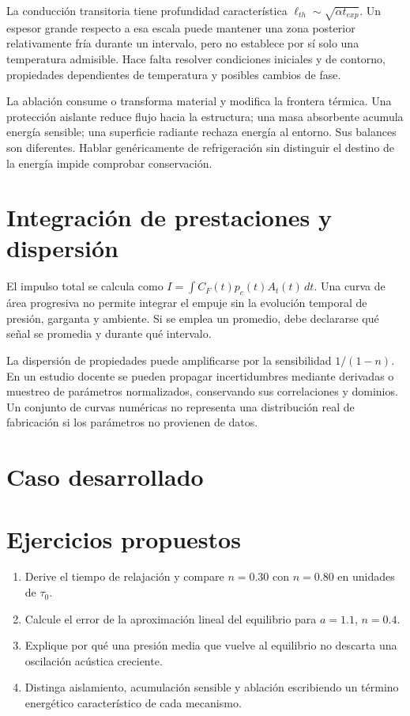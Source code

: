 La conducción transitoria tiene profundidad característica $\ell_{th}\sim\sqrt{\alpha t_{exp}}$. Un espesor grande respecto a esa escala puede mantener una zona posterior relativamente fría durante un intervalo, pero no establece por sí solo una temperatura admisible. Hace falta resolver condiciones iniciales y de contorno, propiedades dependientes de temperatura y posibles cambios de fase.

La ablación consume o transforma material y modifica la frontera térmica. Una protección aislante reduce flujo hacia la estructura; una masa absorbente acumula energía sensible; una superficie radiante rechaza energía al entorno. Sus balances son diferentes. Hablar genéricamente de refrigeración sin distinguir el destino de la energía impide comprobar conservación.\cite{MIT10}
\section{Integración de prestaciones y dispersión}
El impulso total se calcula como $I=\int C_F(t)p_c(t)A_t(t)\,dt$. Una curva de área progresiva no permite integrar el empuje sin la evolución temporal de presión, garganta y ambiente. Si se emplea un promedio, debe declararse qué señal se promedia y durante qué intervalo.

La dispersión de propiedades puede amplificarse por la sensibilidad $1/(1-n)$. En un estudio docente se pueden propagar incertidumbres mediante derivadas o muestreo de parámetros normalizados, conservando sus correlaciones y dominios. Un conjunto de curvas numéricas no representa una distribución real de fabricación si los parámetros no provienen de datos.
\section{Caso desarrollado}

\section{Ejercicios propuestos}
\begin{enumerate}
\item Derive el tiempo de relajación y compare $n=0.30$ con $n=0.80$ en unidades de $\tau_0$.
\item Calcule el error de la aproximación lineal del equilibrio para $a=1.1$, $n=0.4$.
\item Explique por qué una presión media que vuelve al equilibrio no descarta una oscilación acústica creciente.
\item Distinga aislamiento, acumulación sensible y ablación escribiendo un término energético característico de cada mecanismo.
\end{enumerate}


\studiumchaptercheck
